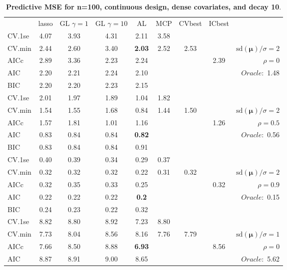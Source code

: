 




\begin{table}\vspace{-.5cm}
\caption[l]{ { \bf Predictive MSE for n=100, continuous design, 
dense covariates, and  decay  10}.}
\vspace{-.5cm}
\footnotesize{}
\begin{center}
\begin{tabular}{l*{7}{c}|r}
 & lasso & GL $\gamma=1$ & GL $\gamma=10$ & AL & MCP  & CVbest & ICbest  \\
\cline{1-9}
CV.1se & 4.07 & 3.93 & 4.31 & 2.11 & 3.58 & & & \\
CV.min & 2.44 & 2.60 & 3.40 & {\bf 2.03} & 2.52 & 2.53 & & $\mathrm{sd}(\mathbf{\mu})/\sigma=2$ \\
AICc & 2.89 & 3.36 & 2.23 & 2.24 & & & 2.39 &  $\rho=0$ \\
AIC & 2.20 & 2.21 & 2.24 & 2.10 & & & &  \multirow{2}{*}{$Oracle: $ 1.48} \\
BIC & 2.20 & 2.20 & 2.23 & 2.15 & & & &  \\
 \hline 
CV.1se & 2.01 & 1.97 & 1.89 & 1.04 & 1.82 & & & \\
CV.min & 1.54 & 1.55 & 1.68 & 0.84 & 1.44 & 1.50 & & $\mathrm{sd}(\mathbf{\mu})/\sigma=2$ \\
AICc & 1.57 & 1.81 & 1.01 & 1.16 & & & 1.26 &  $\rho=0.5$ \\
AIC & 0.83 & 0.84 & 0.84 & {\bf 0.82} & & & &  \multirow{2}{*}{$Oracle: $ 0.56} \\
BIC & 0.83 & 0.84 & 0.84 & 0.91 & & & &  \\
 \hline 
CV.1se & 0.40 & 0.39 & 0.34 & 0.29 & 0.37 & & & \\
CV.min & 0.32 & 0.32 & 0.32 & 0.22 & 0.31 & 0.32 & & $\mathrm{sd}(\mathbf{\mu})/\sigma=2$ \\
AICc & 0.32 & 0.35 & 0.33 & 0.25 & & & 0.32 &  $\rho=0.9$ \\
AIC & 0.22 & 0.22 & 0.22 & {\bf 0.2} & & & &  \multirow{2}{*}{$Oracle: $ 0.15} \\
BIC & 0.24 & 0.23 & 0.22 & 0.32 & & & &  \\
 \hline 
CV.1se & 8.82 & 8.80 & 8.92 & 7.23 & 8.80 & & & \\
CV.min & 7.73 & 8.04 & 8.56 & 8.16 & 7.76 & 7.79 & & $\mathrm{sd}(\mathbf{\mu})/\sigma=1$ \\
AICc & 7.66 & 8.50 & 8.88 & {\bf 6.93} & & & 8.56 &  $\rho=0$ \\
AIC & 8.87 & 8.91 & 9.00 & 8.65 & & & &  \multirow{2}{*}{$Oracle: $ 5.62} \\

\end{tabular}
\end{center}
\end{table}

